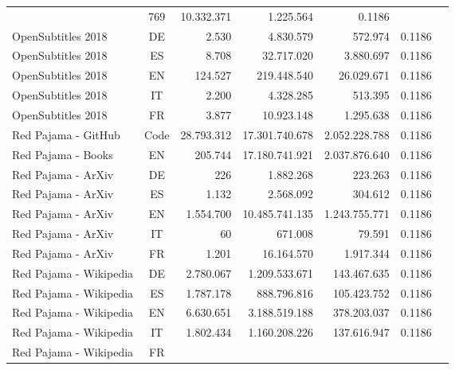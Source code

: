 \begin{table*}[tbh]
\begin{minipage}{0.9\textwidth}
\begin{tabular}{lcrrrrr}
& 769 & 10.332.371 %
& 1.225.564 & 0.1186
\\
OpenSubtitles 2018 & DE %
& 2.530 & 4.830.579 %
& 572.974 & 0.1186
\\
OpenSubtitles 2018 & ES %
& 8.708 & 32.717.020 %
& 3.880.697 & 0.1186
\\
OpenSubtitles 2018 & EN %
& 124.527 & 219.448.540 %
& 26.029.671 & 0.1186
\\
OpenSubtitles 2018 & IT %
& 2.200 & 4.328.285 %
& 513.395 & 0.1186
\\
OpenSubtitles 2018 & FR %
& 3.877 & 10.923.148 %
& 1.295.638 & 0.1186
\\
\midrule
Red Pajama - GitHub & Code %
& 28.793.312 & 17.301.740.678 %
& 2.052.228.788 & 0.1186
\\
Red Pajama - Books & EN %
& 205.744 & 17.180.741.921 %
& 2.037.876.640 & 0.1186
\\
Red Pajama - ArXiv & DE %
& 226 & 1.882.268 %
& 223.263 & 0.1186
\\
Red Pajama - ArXiv & ES %
& 1.132 & 2.568.092 %
& 304.612 & 0.1186
\\
Red Pajama - ArXiv & EN %
& 1.554.700 & 10.485.741.135 %
& 1.243.755.771 & 0.1186
\\
Red Pajama - ArXiv & IT %
& 60 & 671.008 %
& 79.591 & 0.1186
\\
Red Pajama - ArXiv & FR %
& 1.201 & 16.164.570 %
& 1.917.344 & 0.1186
\\
Red Pajama - Wikipedia & DE %
& 2.780.067 & 1.209.533.671 %
& 143.467.635 & 0.1186
\\
Red Pajama - Wikipedia & ES %
& 1.787.178 & 888.796.816 %
& 105.423.752 & 0.1186
\\
Red Pajama - Wikipedia & EN %
& 6.630.651 & 3.188.519.188 %
& 378.203.037 & 0.1186
\\
Red Pajama - Wikipedia & IT %
& 1.802.434 & 1.160.208.226 %
& 137.616.947 & 0.1186
\\
Red Pajama - Wikipedia & FR %

\end{tabular}
\end{minipage}
\end{table*}
